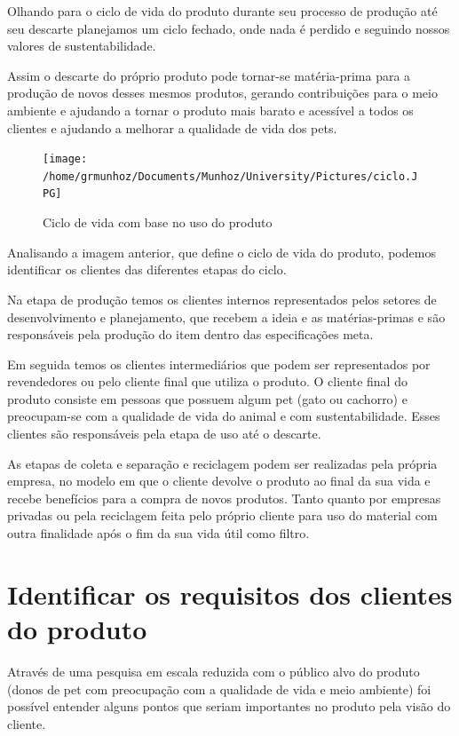 \documentclass[
	12pt,				%
	openright,			%
	oneside,			%
	a4paper,			%
	english,			%
	french,				%
	spanish,			%
	brazil				%
	]{abntex2}
\begin{document}
Olhando para o ciclo de vida do produto durante seu processo de produção até seu descarte planejamos um ciclo fechado, onde nada é perdido e seguindo nossos valores de sustentabilidade.

Assim o descarte do próprio produto pode tornar-se matéria-prima para a produção de novos desses mesmos produtos, gerando contribuições para o meio ambiente e ajudando a tornar o produto mais barato e acessível a todos os clientes e ajudando a melhorar a qualidade de vida dos pets.

\begin{figure}[H]
\begin{center}
\caption{Ciclo de vida com base no uso do produto}
\texttt{[image: /home/grmunhoz/Documents/Munhoz/University/Pictures/ciclo.JPG]} 
\label{figciclo}
\end{center}
\end{figure}

Analisando a imagem anterior, que define o ciclo de vida do produto, podemos identificar os clientes das diferentes etapas do ciclo.

Na etapa de produção temos os clientes internos representados pelos setores de desenvolvimento e planejamento, que recebem a ideia e as matérias-primas e são responsáveis pela produção do item dentro das especificações meta.

Em seguida temos os clientes intermediários que podem ser representados por revendedores ou pelo cliente final que utiliza o produto. O cliente final do produto consiste em pessoas que possuem algum pet (gato ou cachorro) e preocupam-se com a qualidade de vida do animal e com sustentabilidade. Esses clientes são responsáveis pela etapa de uso até o descarte.

As etapas de coleta e separação e reciclagem podem ser realizadas pela própria empresa, no modelo em que o cliente devolve o produto ao final da sua vida e recebe benefícios para a compra de novos produtos. Tanto quanto por empresas privadas ou pela reciclagem feita pelo próprio cliente para uso do material com outra finalidade após o fim da sua vida útil como filtro.


\section{Identificar os requisitos dos clientes do produto}

Através de uma pesquisa em escala reduzida com o público alvo do produto (donos de pet com preocupação com a qualidade de vida e meio ambiente) foi possível entender alguns pontos que seriam importantes no produto pela visão do cliente.
\end{document}
